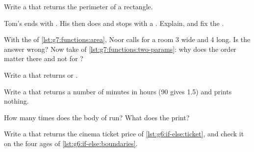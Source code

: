 \begin{exercise}[$\star$]\label{exo:g7:functions:4}
Write a   that returns the perimeter of a
rectangle.
\end{exercise}

\begin{exercise}[$\star\star$]\label{exo:g7:functions:5}
Tom's   ends with . His
 then does  and stops with a
. Explain, and fix the .
\end{exercise}

\begin{exercise}[$\star\star$]\label{exo:g7:functions:6}
With the   of \cref{lst:g7:functions:area}, Noor calls
 for a room 3 wide and 4 long. Is the answer wrong? Now take
 of \cref{lst:g7:functions:two-params}: why does the order
matter there and not for ?
\end{exercise}

\begin{exercise}[$\star\star$]\label{exo:g7:functions:7}
Write a   that returns  or .
\end{exercise}

\begin{exercise}[$\star\star$]\label{exo:g7:functions:8}
Write a   that returns a number of minutes
in hours (90 gives 1.5) and prints nothing.
\end{exercise}

\begin{exercise}[$\star\star$]\label{exo:g7:functions:9}
How many times does the body of  run? What does the  print?

\label{lst:g7:functions:loop-calls}
\end{exercise}

\begin{exercise}[$\star\star\star$]\label{exo:g7:functions:10}
Write a   that returns the cinema ticket price of
\cref{lst:g6:if-else:ticket}, and check it on the four ages of
\cref{lst:g6:if-else:boundaries}.
\end{exercise}

